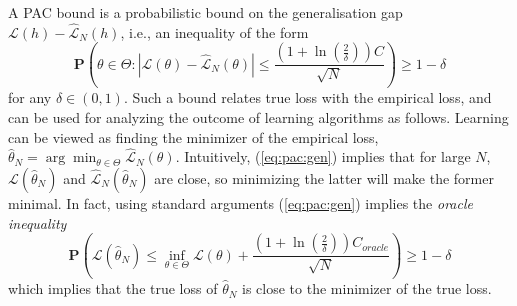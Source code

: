 \documentclass{ifacconf}
\def\eqref#1{(\ref{#1})}
\newcommand{\bP}{\mathbf{P}}
\begin{document}
A PAC bound is a probabilistic bound on the generalisation gap
$\mathcal{L}(h)-\hat{\mathcal{L}}_N(h)$, i.e.,  an inequality of the form
    \begin{equation} \label{eq:pac:gen}
        \bP(\theta \in \Theta: |\mathcal{L} (\theta)- \hat{\mathcal{L}}_N(\theta)| \le 
        \frac{(1+\ln(\frac{2}{\delta}))C}{\sqrt{N}}) \ge 1-\delta
    \end{equation}
  for any $\delta \in (0,1)$. Such a bound relates true loss with the empirical loss,
  and can be used for analyzing the outcome of learning algorithms as follows. 
  Learning can be viewed as finding 
the minimizer of the empirical loss,
\( \hat{\theta}_N = \arg\min_{\theta \in \Theta} \hat{\mathcal{L}}_N(\theta) \).
Intuitively,  \eqref{eq:pac:gen} implies that for large $N$, 
$\mathcal{L} (\hat{\theta}_N)$ and $\hat{\mathcal{L}}_N(\hat{\theta}_N)$ are close, so minimizing
the latter will make the former minimal. In fact, 
using standard arguments \cite{} \eqref{eq:pac:gen} implies the \emph{oracle inequality}
\begin{equation}
\label{eq:oracle}
\bP(\mathcal{L}(\hat{\theta}_N) \le \inf_{\theta \in \Theta} \mathcal{L}(\theta) + \frac{(1+\ln(\frac{2}{\delta}))C_{oracle}}{\sqrt{N}}) \ge 1-\delta 
\end{equation}
which implies that the true loss of $\hat{\theta}_N$ is close to the minimizer of the true loss. 
\end{document}
